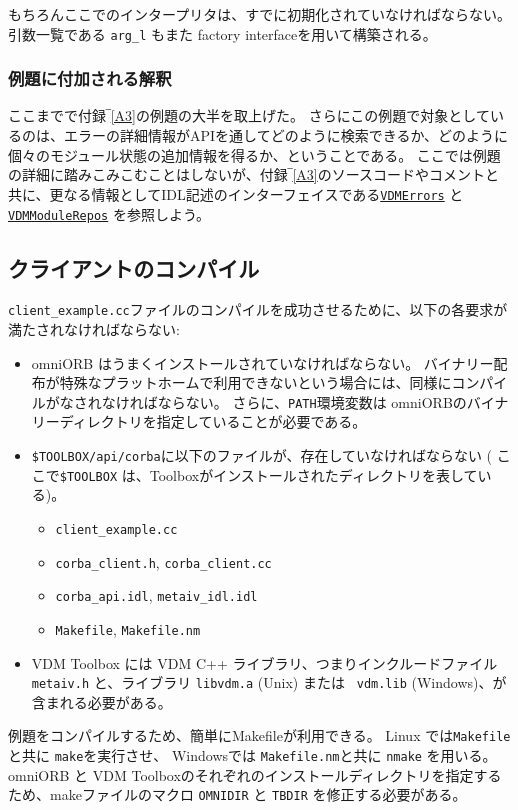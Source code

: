 \documentclass[\pformat,12pt]{jarticle}
\newcommand{\VDMErrors}{\hyperlink{interface.VDMErrors}{VDMErrors}}
\newcommand{\VDMModuleRepos}{\hyperlink{interface.VDMModuleRepos}{VDMModuleRepos}}
\begin{document}
もちろんここでのインタープリタは、すでに初期化されていなければならない。
引数一覧である {\tt arg\_l} もまた factory interfaceを用いて構築される。

\subsubsection{例題に付加される解釈}

ここまでで付録‾\ref{A3}の例題の大半を取上げた。
さらにこの例題で対象としているのは、エラーの詳細情報がAPIを通してどのように検索できるか、どのように個々のモジュール状態の追加情報を得るか、ということである。
ここでは例題の詳細に踏みこみこむことはしないが、付録‾\ref{A3}のソースコードやコメントと共に、更なる情報としてIDL記述のインターフェイスである{\tt \VDMErrors} と{\tt \VDMModuleRepos} を参照しよう。

\subsection{クライアントのコンパイル}

{\tt client\_example.cc}ファイルのコンパイルを成功させるために、以下の各要求が満たされなければならない: 

\begin{itemize}
\item  omniORB はうまくインストールされていなければならない。
バイナリー配布が特殊なプラットホームで利用できないという場合には、同様にコンパイルがなされなければならない。
さらに、{\tt PATH}環境変数は omniORBのバイナリーディレクトリを指定していることが必要である。
\item 
 \texttt{\$TOOLBOX/api/corba}に以下のファイルが、存在していなければならない ( ここで\texttt{\$TOOLBOX} は、Toolboxがインストールされたディレクトリを表している)。
\begin{itemize}
\item {\tt client\_example.cc}
\item {\tt corba\_client.h}, {\tt corba\_client.cc}
\item {\tt corba\_api.idl}, {\tt metaiv\_idl.idl}
\item {\tt Makefile}, {\tt Makefile.nm}
\end{itemize}
\item
 VDM Toolbox には VDM C++ ライブラリ、つまりインクルードファイル {\tt metaiv.h} と、ライブラリ {\tt libvdm.a} (Unix) または {\tt
vdm.lib} (Windows)、が含まれる必要がある。 
\end{itemize}

例題をコンパイルするため、簡単にMakefileが利用できる。
 Linux では{\tt Makefile}と共に {\tt make}を実行させ、 Windowsでは {\tt Makefile.nm}と共に {\tt nmake} を用いる。
omniORB と VDM Toolboxのそれぞれのインストールディレクトリを指定するため、makeファイルのマクロ {\tt OMNIDIR} と {\tt TBDIR} を修正する必要がある。
\end{document}
